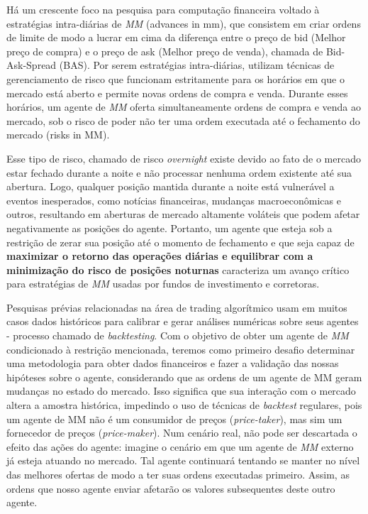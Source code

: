 Há um crescente foco na pesquisa para computação financeira voltado à estratégias intra-diárias de \textit{MM} \cite{} (advances in mm), que consistem em criar ordens de limite de modo a lucrar em cima da diferença entre o preço de bid (Melhor preço de compra) e o preço de ask (Melhor preço de venda), chamada de Bid-Ask-Spread (BAS). Por serem estratégias intra-diárias, utilizam técnicas de gerenciamento de risco que funcionam estritamente para os horários em que o mercado está aberto e permite novas ordens de compra e venda. Durante esses horários, um agente de \textit{MM} oferta simultaneamente ordens de compra e venda ao mercado, sob o risco de poder não ter uma ordem executada até o fechamento do mercado\cite{} (risks in MM).

Esse tipo de risco, chamado de risco \textit{overnight} existe devido ao fato de o mercado estar fechado durante a noite e não processar nenhuma ordem existente até sua abertura. Logo, qualquer posição mantida durante a noite está vulnerável a eventos inesperados, como notícias financeiras, mudanças macroeconômicas e outros, resultando em aberturas de mercado altamente voláteis que podem afetar negativamente as posições do agente. Portanto, um agente que esteja sob a restrição de zerar sua posição até o momento de fechamento e que seja capaz de \textbf{maximizar o retorno das operações diárias e equilibrar com a minimização do risco de posições noturnas} caracteriza um avanço crítico para estratégias de \textit{MM} usadas por fundos de investimento e corretoras.

Pesquisas prévias relacionadas na área de trading algorítmico usam em muitos casos dados históricos para calibrar e gerar análises numéricas sobre seus agentes - processo chamado de \textit{backtesting}. Com o objetivo de obter um agente de \textit{MM} condicionado à restrição mencionada, teremos como primeiro desafio determinar uma metodologia para obter dados financeiros e fazer a validação das nossas hipóteses sobre o agente, considerando que as ordens de um agente de MM geram mudanças no estado do mercado. Isso significa que sua interação com o mercado altera a amostra histórica, impedindo o uso de técnicas de \textit{backtest} regulares, pois um agente de MM não é um consumidor de preços (\textit{price-taker}), mas sim um fornecedor de preços (\textit{price-maker}). Num cenário real, não pode ser descartada o efeito das ações do agente: imagine o cenário em que um agente de \textit{MM} externo já esteja atuando no mercado. Tal agente continuará tentando se manter no nível das melhores ofertas de modo a ter suas ordens executadas primeiro. Assim, as ordens que nosso agente enviar afetarão os valores subsequentes deste outro agente.

